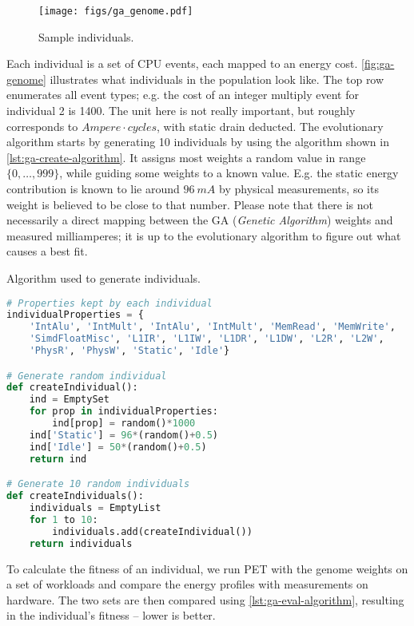 \begin{figure}[hbt]
    \centering
    \def\svgwidth{\columnwidth}
    \texttt{[image: figs/ga\_genome.pdf]}
    \caption{Sample individuals.}
    \label{fig:ga-genome}
\end{figure}

Each individual is a set of CPU events, each mapped to an energy cost.
\autoref{fig:ga-genome} illustrates what individuals in the population look
like. The top row enumerates all event types; e.g. the cost of an integer
multiply event for individual 2 is 1400. The unit here is not really important,
but roughly corresponds to $Ampere \cdot cycles$, with static drain deducted.
The evolutionary algorithm starts by generating 10 individuals by using the
algorithm shown in \autoref{lst:ga-create-algorithm}. It assigns most weights a
random value in range $\{0, \ldots, 999\}$, while guiding some weights to a
known value. E.g. the static energy contribution is known to lie around $96~mA$
by physical measurements, so its weight is believed to be close to that number.
Please note that there is not necessarily a direct mapping between the GA
(\emph{Genetic Algorithm}) weights and measured milliamperes; it is up to the
evolutionary algorithm to figure out what causes a best fit.

\begin{algorithm}
\caption{Algorithm used to generate individuals.}
\label{lst:ga-create-algorithm}
\begin{lstlisting}[language=python,style=algo]
# Properties kept by each individual
individualProperties = {
    'IntAlu', 'IntMult', 'IntAlu', 'IntMult', 'MemRead', 'MemWrite',
    'SimdFloatMisc', 'L1IR', 'L1IW', 'L1DR', 'L1DW', 'L2R', 'L2W',
    'PhysR', 'PhysW', 'Static', 'Idle'}

# Generate random individual
def createIndividual():
    ind = EmptySet
    for prop in individualProperties:
        ind[prop] = random()*1000
    ind['Static'] = 96*(random()+0.5)
    ind['Idle'] = 50*(random()+0.5)
    return ind

# Generate 10 random individuals
def createIndividuals():
    individuals = EmptyList
    for 1 to 10:
        individuals.add(createIndividual())
    return individuals
\end{lstlisting}
\end{algorithm}

To calculate the fitness of an individual, we run PET with the genome weights on
a set of workloads and compare the energy profiles with measurements on
hardware. The two sets are then compared using \autoref{lst:ga-eval-algorithm},
resulting in the individual's fitness -- lower is better.

